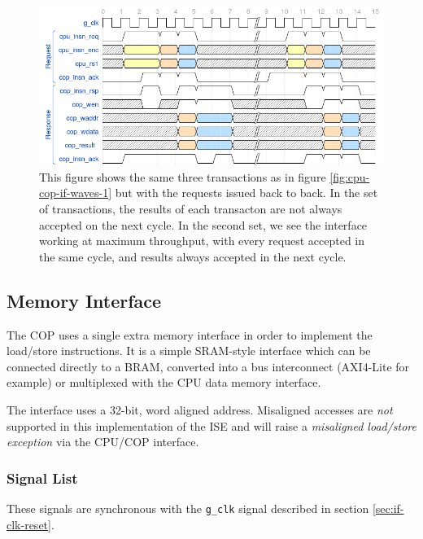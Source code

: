 \documentclass{article}
\begin{document}
\begin{figure}[H]
\centering
\includegraphics[width=\textwidth]{./diagrams/cpu-cop-if-2.png}
\caption{This figure shows the same three transactions as in figure
\ref{fig:cpu-cop-if-waves-1} but with the requests issued back to back.
In the set of transactions, the results of each transacton are not always
accepted on the next cycle. In the second set, we see the interface working
at maximum throughput, with every request accepted in the same cycle, and
results always accepted in the next cycle.}
\end{figure}



\subsection{Memory Interface}

The COP uses a single extra memory interface in order to implement the
load/store instructions. It is a simple SRAM-style interface which can be
connected directly to a BRAM, converted into a bus interconnect (AXI4-Lite
for example) or multiplexed with the CPU data memory interface.

The interface uses a 32-bit, word aligned address. Misaligned accesses
are {\em not} supported in this implementation of the ISE and will raise
a {\em misaligned load/store exception} via the CPU/COP interface.

\subsubsection{Signal List}

These signals are synchronous with the {\tt g\_clk} signal described in
section \ref{sec:if-clk-reset}.
\end{document}
